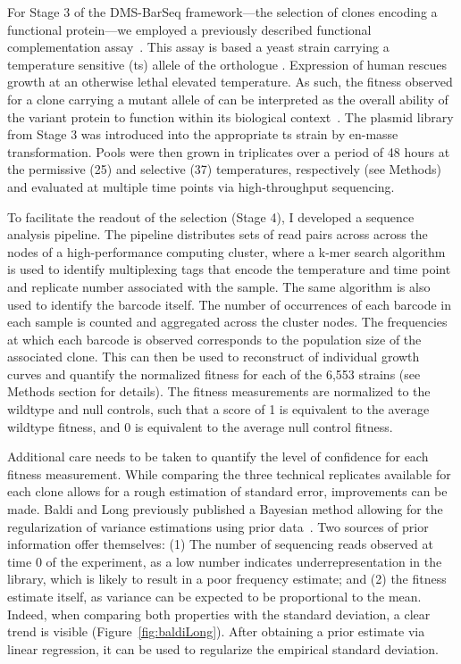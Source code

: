 For Stage 3 of the DMS-BarSeq framework---the selection of clones encoding a functional protein---we employed a previously described  functional complementation assay~\cite{lee_complementation_1987,osborn_rescuing_2007}. This assay is based a yeast strain carrying a temperature sensitive (ts) allele of the  orthologue . Expression of human  rescues growth at an otherwise lethal elevated temperature. As such, the fitness observed for a clone carrying a mutant allele of  can be interpreted as the overall ability of the variant protein to function within its biological context~\cite{sun_extended_2016}. 
The plasmid library from Stage 3 was introduced into the appropriate ts strain by en-masse transformation. Pools were then grown in triplicates over a period of 48 hours at the permissive (25\celsius ) and selective (37\celsius ) temperatures, respectively (see Methods) and evaluated at multiple time points via high-throughput sequencing.

To facilitate the readout of the selection (Stage 4), I developed a sequence analysis pipeline. The pipeline distributes sets of read pairs across across the nodes of a high-performance computing cluster, where a k-mer search algorithm is used to identify multiplexing tags that encode the temperature and time point and replicate number associated with the sample. The same algorithm is also used to identify the barcode itself. The number of occurrences of each barcode in each sample is counted and aggregated across the cluster nodes. The frequencies at which each barcode is observed corresponds to the population size of the associated clone. This can then be used to reconstruct of individual growth curves and quantify the normalized fitness for each of the 6,553 strains (see Methods section for details). The fitness measurements are normalized to the wildtype and null controls, such that a score of 1 is equivalent to the average wildtype fitness, and 0 is equivalent to the average null control fitness.

Additional care needs to be taken to quantify the level of confidence for each fitness measurement. While comparing the three technical replicates available for each clone allows for a rough estimation of standard error, improvements can be made. Baldi and Long previously published a Bayesian method allowing for the regularization of variance estimations using prior data~\cite{baldi_bayesian_2001}. Two sources of prior information offer themselves: (1) The number of sequencing reads observed at time 0 of the experiment, as a low number indicates underrepresentation in the library, which is likely to result in a poor frequency estimate; and (2) the fitness estimate itself, as variance can be expected to be proportional to the mean. Indeed, when comparing both properties with the standard deviation, a clear trend is visible (Figure~\ref{fig:baldiLong}). After obtaining a prior estimate via linear regression, it can be used to regularize the empirical standard deviation.

